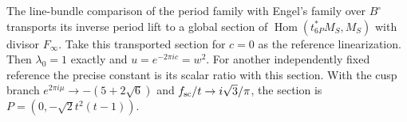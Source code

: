 \begin{proposition}\hypertarget{tag-01QA}{}\label{fam:src:B.1.4}\label{fam:st:B.1.4}

The line-bundle comparison of the period family with Engel's family over $B^\circ$ transports its inverse period lift to a global section of $\operatorname{Hom}(t_{6P}^*M_S,M_S)$ with divisor $F_\infty$. Take this transported section for $c=0$ as the reference linearization. Then $\lambda_0=1$ exactly and $u=e^{-2\pi ic}=w^2$. For another independently fixed reference the precise constant is its scalar ratio with this section. With the cusp branch $e^{2\pi i\mu}\to-(5+2\sqrt6)$ and $f_{\rm sc}/t\to i\sqrt3/\pi$, the section is $P=(0,-\sqrt2t^2(t-1))$.
\end{proposition}


